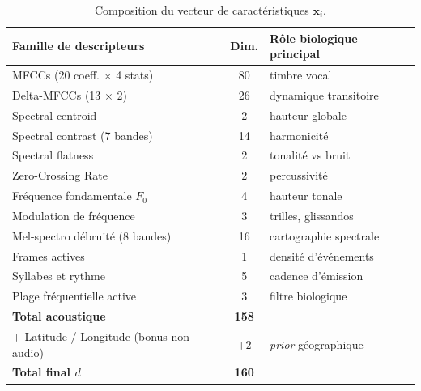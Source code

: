 \begin{table}[h]
    \centering
    \small
    \begin{tabular}{lcl}
        \hline
        \textbf{Famille de descripteurs}           & \textbf{Dim.} & \textbf{Rôle biologique principal} \\
        \hline
        MFCCs (20 coeff. $\times$ 4 stats)         & 80            & timbre vocal                       \\
        Delta-MFCCs (13 $\times$ 2)                & 26            & dynamique transitoire              \\
        Spectral centroid                          & 2             & hauteur globale                    \\
        Spectral contrast (7 bandes)               & 14            & harmonicité                        \\
        Spectral flatness                          & 2             & tonalité vs bruit                  \\
        Zero-Crossing Rate                         & 2             & percussivité                       \\
        Fréquence fondamentale $F_0$               & 4             & hauteur tonale                     \\
        Modulation de fréquence                    & 3             & trilles, glissandos                \\
        Mel-spectro débruité (8 bandes)            & 16            & cartographie spectrale             \\
        Frames actives                             & 1             & densité d'événements               \\
        Syllabes et rythme                         & 5             & cadence d'émission                 \\
        Plage fréquentielle active                 & 3             & filtre biologique                  \\
        \hline
        \textbf{Total acoustique}                  & \textbf{158}  &                                    \\
        $+$ Latitude / Longitude (bonus non-audio) & $+2$          & \textit{prior} géographique        \\
        \hline
        \textbf{Total final $d$}                   & \textbf{160}  &                                    \\
        \hline
    \end{tabular}
    \caption{Composition du vecteur de caractéristiques $\mathbf{x}_i$.}
    \label{tab:features}
\end{table}

